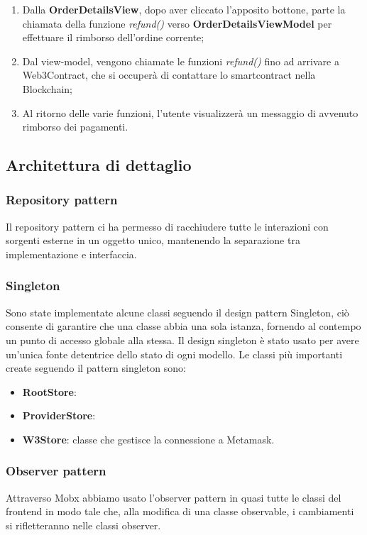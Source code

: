 \begin{enumerate}
    \item Dalla \textbf{OrderDetailsView}, dopo aver cliccato l'apposito bottone, parte la chiamata della funzione \textit{refund()} verso \textbf{OrderDetailsViewModel} per effettuare il rimborso dell'ordine corrente;
    \item Dal view-model, vengono chiamate le funzioni \textit{refund()} fino ad arrivare a Web3Contract, che si occuperà di contattare lo smartcontract nella Blockchain;
    \item Al ritorno delle varie funzioni, l'utente visualizzerà un messaggio di avvenuto rimborso dei pagamenti.
\end{enumerate}

\clearpage
\subsection{Architettura di dettaglio}

\subsubsection{Repository pattern}

Il repository pattern ci ha permesso di racchiudere tutte le interazioni con sorgenti esterne in un oggetto unico, mantenendo la separazione tra implementazione e interfaccia.

\subsubsection{Singleton}

Sono state implementate alcune classi seguendo il design pattern Singleton,
 ciò consente di garantire che una classe abbia una sola istanza, fornendo al contempo un punto di accesso globale alla stessa.
Il design singleton è stato usato per avere un'unica fonte detentrice dello stato di ogni modello.
Le classi più importanti create seguendo il pattern singleton sono:

\begin{itemize}
    \item \textbf{RootStore}: 
    \item \textbf{ProviderStore}: 
    \item \textbf{W3Store}: classe che gestisce la connessione a Metamask.
\end{itemize}

\subsubsection{Observer pattern}

Attraverso Mobx abbiamo usato l'observer pattern in quasi tutte le classi del frontend in modo tale che, alla modifica di una classe observable, i cambiamenti si rifletteranno nelle classi observer.